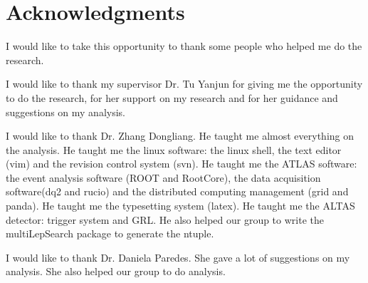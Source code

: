 
\chapter*{Acknowledgments}

I would like to take this opportunity to thank some people who helped me do the research.

I would like to thank my supervisor Dr. Tu Yanjun for giving me the opportunity to do the research, for her support on my research and for her guidance and suggestions on my analysis.

I would like to thank Dr. Zhang Dongliang.
He taught me almost everything on the analysis.
He taught me the linux software: the linux shell, the text editor (vim) and the revision control system (svn).
He taught me the ATLAS software: the event analysis software (ROOT and RootCore), the data acquisition software(dq2 and rucio) and the distributed computing management (grid and panda).
He taught me the typesetting system (latex).
He taught me the ALTAS detector: trigger system and GRL.
He also helped our group to write the multiLepSearch package to generate the ntuple.

I would like to thank Dr. Daniela Paredes.
She gave a lot of suggestions on my analysis.
She also helped our group to do analysis.
